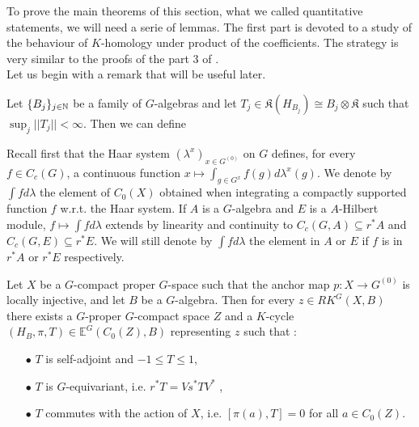 
To prove the main theorems of this section, what we called quantitative statements, we will need a serie of lemmas. The first part is devoted to a study of the behaviour of $K$-homology under product of the coefficients. The strategy is very similar to the proofs of the part $3$ of \cite{TuBC2}. \\

Let us begin with a remark that will be useful later.

\begin{rk}\label{construction}
Let $\{B_j\}_{j\in\mathbb N}$ be a family of $G$-algebras and let $T_j \in \mathfrak K (H_{B_j})\cong B_j \otimes\mathfrak K$ such that $\sup_j ||T_j||<\infty$. Then we can define  
\end{rk}

Recall first that the Haar system $(\lambda^x)_{x\in G^{(0)}}$ on $G$ defines, for every $f\in C_c(G)$, a continuous function $x\mapsto \int_{g\in G^x}f(g)d\lambda^x(g)$. We denote by $\int f d\lambda$ the element of $C_0(X)$ obtained when integrating a compactly supported function $f$ w.r.t. the Haar system. If $A$ is a $G$-algebra and $E$ is a $A$-Hilbert module, $f\mapsto \int f d\lambda$ extends by linearity and continuity to $C_c(G,A)\subseteq r^*A $ and $C_c(G,E)\subseteq r^*E$. We will still denote by $\int fd\lambda$ the element in $A$ or $E$ if $f$ is in $r^* A$ or $r^* E$ respectively. %

\begin{lem}\label{JLTform}
Let $X$ be a $G$-compact proper $G$-space such that the anchor map $p:X\rightarrow G^{(0)}$ is locally injective, and let $B$ be a $G$-algebra. Then for every $z\in RK^G(X,B)$ there exists a $G$-proper $G$-compact space $Z$ and a $K$-cycle $(H_B, \pi, T)\in \mathbb E^G(C_0(Z),B)$ representing $z$ such that :
\begin{itemize}
\item[$\bullet$] $T$ is self-adjoint and $-1 \leq T\leq 1$,
\item[$\bullet$] $T$ is $G$-equivariant, i.e. $r^* T = V s^*T V^*$ ,
\item[$\bullet$] $T$ commutes with the action of $X$, i.e. $[\pi(a),T]= 0$ for all $a\in C_0(Z)$.
\end{itemize}
\end{lem}

